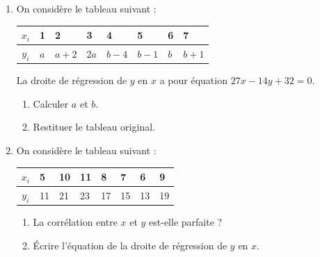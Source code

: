 \documentclass[11pt,a4paper]{article}
\begin{document}
\begin{enumerate}[label=\alph*)]
    \item On considère le tableau suivant :
          \begin{center}
            \begin{tabular}{|c|*{7}{C{1cm}|}}
              \hline
              $x_i$ & 1 & 2 & 3 & 4 & 5 & 6 & 7\\ \hline
              $y_i$ & $a$ & $a+2$ & $2a$ & $b-4$ & $b-1$ & $b$ & $b+1$\\ \hline
            \end{tabular}
          \end{center}
          La droite de régression de $y$ en $x$ a pour équation
          $27x - 14y + 32 = 0$.
          \begin{enumerate}[label=\roman*)]
            \item Calculer $a$ et $b$.
            \item Restituer le tableau original.
          \end{enumerate}

    \item On considère le tableau suivant :
          \begin{center}
            \begin{tabular}{|c|*{7}{C{0.8cm}|}}
              \hline
              $x_i$ & 5 & 10 & 11 & 8 & 7 & 6 & 9\\ \hline
              $y_i$ & 11 & 21 & 23 & 17 & 15 & 13 & 19\\ \hline
            \end{tabular}
          \end{center}
          \begin{enumerate}[label=\roman*)]
            \item La corrélation entre $x$ et $y$ est-elle parfaite ?
            \item Écrire l'équation de la droite de régression de $y$ en $x$.
          \end{enumerate}
  \end{enumerate}
\end{document}
